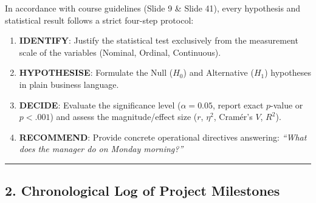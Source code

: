 \documentclass[
]{article}
\providecommand{\tightlist}{%
  \setlength{\itemsep}{0pt}\setlength{\parskip}{0pt}}
\begin{document}
In accordance with course guidelines (Slide 9 \& Slide 41), every
hypothesis and statistical result follows a strict four-step protocol:

\begin{enumerate}
\def\labelenumi{\arabic{enumi}.}
\tightlist
\item
  \textbf{IDENTIFY}: Justify the statistical test exclusively from the
  measurement scale of the variables (Nominal, Ordinal, Continuous).
\item
  \textbf{HYPOTHESISE}: Formulate the Null (\(H_0\)) and Alternative
  (\(H_1\)) hypotheses in plain business language.
\item
  \textbf{DECIDE}: Evaluate the significance level (\(\alpha = 0.05\),
  report exact \(p\)-value or \(p < .001\)) and assess the
  magnitude/effect size (\(r\), \(\eta^2\), Cramér's \(V\), \(R^2\)).
\item
  \textbf{RECOMMEND}: Provide concrete operational directives answering:
  \emph{``What does the manager do on Monday morning?''}
\end{enumerate}

\begin{center}\rule{0.5\linewidth}{0.5pt}\end{center}

\subsection{2. Chronological Log of Project
Milestones}\label{chronological-log-of-project-milestones}
\end{document}
